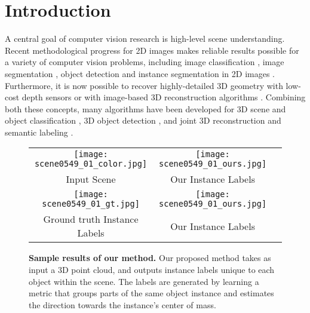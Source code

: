 \documentclass[10pt,twocolumn,letterpaper]{article}
\begin{document}
\section{Introduction}
A central goal of computer vision research is high-level scene understanding.
Recent methodological progress for 2D images makes reliable results possible for a variety of computer vision problems, including image classification \cite{Krizhevsky-et-al-NIPS-2012,Simonyan-Zisserman-ICLR-2015,Szegedy-et-al-CVPR-2015}, image segmentation \cite{Long-et-al-CVPR-2015,Ronneberger-et-al-MICCAI-2015,Badrinarayanan-et-al-TPAMI-2017}, object detection \cite{Ren-et-al-NIPS-2015,Lin-et-al-CVPR-2017,Redmon-et-al-CVPR-2016} and instance segmentation in 2D images
\cite{Dai-et-al-CVPR-2016,He-et-al-ICCV-2017,Pinheiro-et-al-NIPS-2015}.
Furthermore, it is now possible to recover highly-detailed 3D geometry with low-cost depth sensors \cite{Zach-et-al-ICCV-2007,Izadi-et-al-SIGGRAPH-2011,Niessner-et-al-SIGGRAPH-2013,Steinbruecker-et-al-ICCV-2013} or with image-based 3D reconstruction algorithms \cite{Kolev-et-al-IJCV-2009,Furukawa-Ponce-TPAMI-2010,Schoenberger-et-al-ECCV-2016}. 
Combining both these concepts, many algorithms have been developed for 3D scene and object classification \cite{Socher-et-al-NIPS-2012,Wu-et-al-CVPR-2015,Maturana-Scherer-ICIRS-2015}, 3D object detection \cite{Yang-et-al-CVPR-2018,lahoud20172d}, and joint 3D reconstruction and semantic labeling \cite{Kundu-et-al-ECCV-2014,Tateno-et-al-CVPR-2017,Dai-et-al-CVPR-2018,Dai-Niessner-ECCV-2018,Cherabier-et-al-ECCV-2018}.


\begin{figure}[t]
  \small
\centering
\newcommand{\sz}{0.4}
  \begin{tabular}{ccc}
\texttt{[image: scene0549\_01\_color.jpg]} & 
    \texttt{[image: scene0549\_01\_ours.jpg]} \\
Input Scene & Our Instance Labels \\
\texttt{[image: scene0549\_01\_gt.jpg]} & 
    \texttt{[image: scene0549\_01\_ours.jpg]} \\
Ground truth Instance Labels  & Our Instance Labels \\
  \end{tabular}
  \vspace{0.1cm}
  \caption{\textbf{Sample results of our method.} Our proposed method takes as input a 3D point cloud, and outputs instance labels unique to each object within the scene. The labels are generated by learning a metric that groups parts of the same object instance and estimates the direction towards the instance's center of mass.}\label{fig:teaser}
\end{figure}
\end{document}
